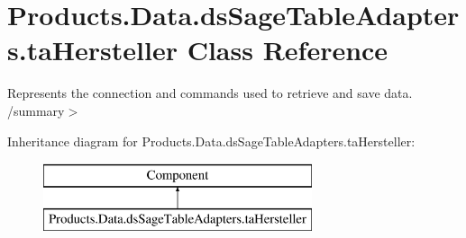 \hypertarget{class_products_1_1_data_1_1ds_sage_table_adapters_1_1ta_hersteller}{}\section{Products.\+Data.\+ds\+Sage\+Table\+Adapters.\+ta\+Hersteller Class Reference}
\label{class_products_1_1_data_1_1ds_sage_table_adapters_1_1ta_hersteller}


Represents the connection and commands used to retrieve and save data. /summary$>$  


Inheritance diagram for Products.\+Data.\+ds\+Sage\+Table\+Adapters.\+ta\+Hersteller\+:\begin{figure}[H]
\begin{center}
\leavevmode
\includegraphics[height=2.000000cm]{class_products_1_1_data_1_1ds_sage_table_adapters_1_1ta_hersteller}
\end{center}
\end{figure}
